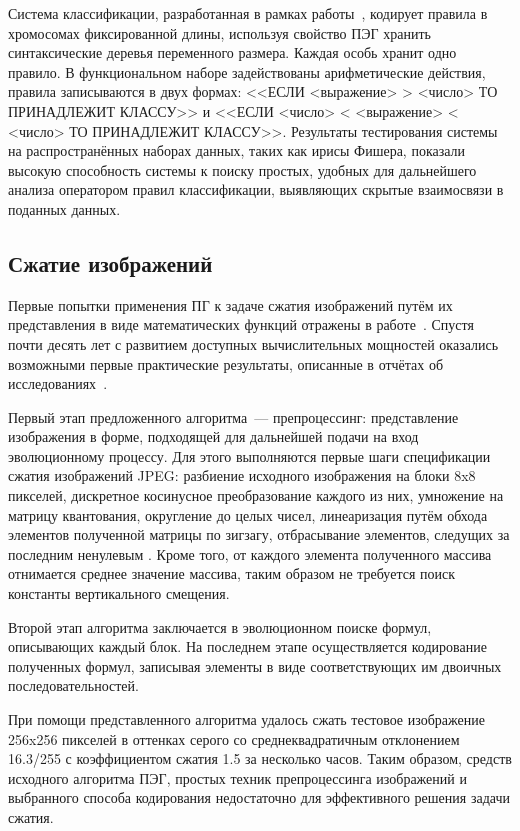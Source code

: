 Система классификации, разработанная в рамках работы~\cite{Dehuri:2008:MCR:1471604.1472090}, кодирует правила в хромосомах фиксированной длины, используя свойство ПЭГ хранить синтаксические деревья переменного размера. Каждая особь хранит одно правило. В функциональном наборе задействованы арифметические действия, правила записываются в двух формах: <<ЕСЛИ <выражение> > <число> ТО ПРИНАДЛЕЖИТ КЛАССУ>> и <<ЕСЛИ <число> < <выражение> < <число> ТО ПРИНАДЛЕЖИТ КЛАССУ>>. Результаты тестирования системы на распространённых наборах данных, таких как ирисы Фишера, показали высокую способность системы к поиску простых, удобных для дальнейшего анализа оператором правил классификации, выявляющих скрытые взаимосвязи в поданных данных.


\subsection{Сжатие изображений}

Первые попытки применения ПГ к задаче сжатия изображений путём их представления в виде математических функций отражены в работе~\cite{fukunaga1998evolving}. Спустя почти десять лет с развитием доступных вычислительных мощностей оказались возможными первые практические результаты, описанные в отчётах об исследованиях~\cite{techrep/Ashworth06, techrep/Gempeler06}.

Первый этап предложенного алгоритма~--- препроцессинг: представление изображения в форме, подходящей для дальнейшей подачи на вход эволюционному процессу. Для этого выполняются первые шаги спецификации сжатия изображений JPEG: разбиение исходного изображения на блоки 8x8 пикселей, дискретное косинусное преобразование каждого из них, умножение на матрицу квантования, округление до целых чисел, линеаризация путём обхода элементов полученной матрицы по зигзагу, отбрасывание элементов, следущих за последним ненулевым \cite{jpeg1993}. Кроме того, от каждого элемента полученного массива отнимается среднее значение массива, таким образом не требуется поиск константы вертикального смещения.

Второй этап алгоритма заключается в эволюционном поиске формул, описывающих каждый блок. На последнем этапе осуществляется кодирование полученных формул, записывая элементы в виде соответствующих им двоичных последовательностей.

При помощи представленного алгоритма удалось сжать тестовое изображение 256x256 пикселей в оттенках серого со среднеквадратичным отклонением 16.3/255 с коэффициентом сжатия 1.5 за несколько часов. Таким образом, средств исходного алгоритма ПЭГ, простых техник препроцессинга изображений и выбранного способа кодирования недостаточно для эффективного решения задачи сжатия.


